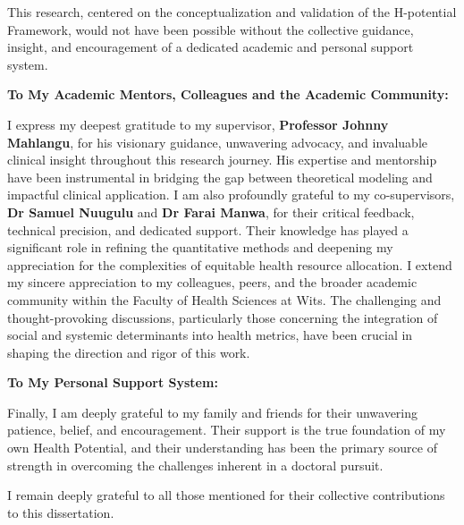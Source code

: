 \noindent This research, centered on the conceptualization and validation of the H-potential Framework, would not have been possible without the collective guidance, insight, and encouragement of a dedicated academic and personal support system.

\textbf{To My Academic Mentors, Colleagues and the Academic Community:}

I express my deepest gratitude to my supervisor, \textbf{Professor Johnny Mahlangu}, for his visionary guidance, unwavering advocacy, and invaluable clinical insight throughout this research journey. His expertise and mentorship have been instrumental in bridging the gap between theoretical modeling and impactful clinical application. I am also profoundly grateful to my co-supervisors, \textbf{Dr Samuel Nuugulu} and \textbf{Dr Farai Manwa}, for their critical feedback, technical precision, and dedicated support. Their knowledge has played a significant role in refining the quantitative methods and deepening my appreciation for the complexities of equitable health resource allocation.
I extend my sincere appreciation to my colleagues, peers, and the broader academic community within the Faculty of Health Sciences at Wits. The challenging and thought-provoking discussions, particularly those concerning the integration of social and systemic determinants into health metrics, have been crucial in shaping the direction and rigor of this work.



\textbf{To My Personal Support System:}

Finally, I am deeply grateful to my family and friends for their unwavering patience, belief, and encouragement. Their support is the true foundation of my own Health Potential, and their understanding has been the primary source of strength in overcoming the challenges inherent in a doctoral pursuit.

\noindent I remain deeply grateful to all those mentioned for their collective contributions to this dissertation.